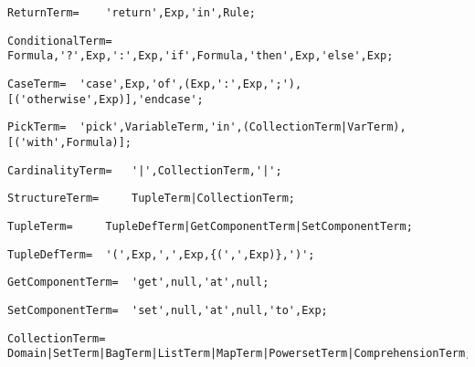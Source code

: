 \documentclass{article}
\begin{document}
    \begin{lstlisting}[mathescape=true]
     ReturnTerm= 	'return',Exp,'in',Rule;
    \end{lstlisting}
    
    \begin{lstlisting}[mathescape=true]
     ConditionalTerm= 	Formula,'?',Exp,':',Exp,'if',Formula,'then',Exp,'else',Exp;
    \end{lstlisting}
    
    \begin{lstlisting}[mathescape=true]
     CaseTerm= 	'case',Exp,'of',(Exp,':',Exp,';'),[('otherwise',Exp)],'endcase';
    \end{lstlisting}
    
    \begin{lstlisting}[mathescape=true]
     PickTerm= 	'pick',VariableTerm,'in',(CollectionTerm|VarTerm),[('with',Formula)];
    \end{lstlisting}
    
    \begin{lstlisting}[mathescape=true]
     CardinalityTerm= 	'|',CollectionTerm,'|';
    \end{lstlisting}
    
    \begin{lstlisting}[mathescape=true]
     StructureTerm= 	TupleTerm|CollectionTerm;
    \end{lstlisting}
    
    \begin{lstlisting}[mathescape=true]
     TupleTerm= 	TupleDefTerm|GetComponentTerm|SetComponentTerm;
    \end{lstlisting}
    
    \begin{lstlisting}[mathescape=true]
     TupleDefTerm= 	'(',Exp,',',Exp,{(',',Exp)},')';
    \end{lstlisting}
    
    \begin{lstlisting}[mathescape=true]
     GetComponentTerm= 	'get',null,'at',null;
    \end{lstlisting}
    
    \begin{lstlisting}[mathescape=true]
     SetComponentTerm= 	'set',null,'at',null,'to',Exp;
    \end{lstlisting}
    
    \begin{lstlisting}[mathescape=true]
     CollectionTerm= 	Domain|SetTerm|BagTerm|ListTerm|MapTerm|PowersetTerm|ComprehensionTerm;
    \end{lstlisting}
    
\end{document}
